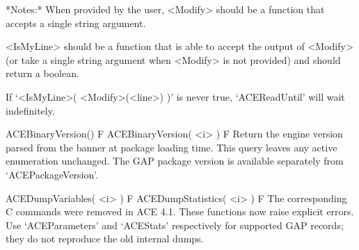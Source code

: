 *Notes:* 
When provided by the user, <Modify> should be a function that  accepts
a single string argument.

<IsMyLine> should be a function that is able to accept the  output  of
<Modify> (or take a  single  string  argument  when  <Modify>  is  not
provided) and should return a boolean.

If `<IsMyLine>( <Modify>(<line>) )' is never true, `ACEReadUntil' will
wait indefinitely.



\beginitems
\>ACEBinaryVersion() F
\>ACEBinaryVersion( <i> ) F
Return the engine version parsed from the banner at package loading time.
This query leaves any active enumeration unchanged. The GAP package version
is available separately from `ACEPackageVersion'.

\>ACEDumpVariables( <i> ) F
\>ACEDumpStatistics( <i> ) F
The corresponding C commands were removed in ACE 4.1. These functions now
raise explicit errors. Use `ACEParameters' and `ACEStats' respectively for
supported GAP records; they do not reproduce the old internal dumps.
\enditems
